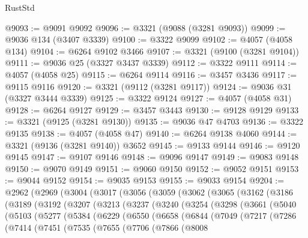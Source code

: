 \begin{lexlean}{RustStd}
\begin{coremodule}
@9093 := @9091 @9092
@9096 := @3321 (@9088 (@3281 @9093))
@9099 := @9036 @134 (@3407 @3339)
@9100 := @3322 @9099
@9102 := @4057 (@4058 @134)
@9104 := @6264 @9102 @3466
@9107 := @3321 (@9100 (@3281 @9104))
@9111 := @9036 @25 (@3327 @3437 @3339)
@9112 := @3322 @9111
@9114 := @4057 (@4058 @25)
@9115 := @6264 @9114
@9116 := @3457 @3436
@9117 := @9115 @9116
@9120 := @3321 (@9112 (@3281 @9117))
@9124 := @9036 @31 (@3327 @3444 @3339)
@9125 := @3322 @9124
@9127 := @4057 (@4058 @31)
@9128 := @6264 @9127
@9129 := @3457 @3443
@9130 := @9128 @9129
@9133 := @3321 (@9125 (@3281 @9130))
@9135 := @9036 @47 @4703
@9136 := @3322 @9135
@9138 := @4057 (@4058 @47)
@9140 := @6264 @9138 @4060
@9144 := @3321 (@9136 (@3281 @9140)) @3652
@9145 := @9133 @9144
@9146 := @9120 @9145
@9147 := @9107 @9146
@9148 := @9096 @9147
@9149 := @9083 @9148
@9150 := @9070 @9149
@9151 := @9060 @9150
@9152 := @9052 @9151
@9153 := @9044 @9152
@9154 := @9035 @9153
@9155 := @9033 @9154
@9204 := @2962
    (@2969
      (@3004
        (@3017
          (@3056
            (@3059
              (@3062
                (@3065
                  (@3162
                    (@3186
                      (@3189
                        (@3192
                          (@3207
                            (@3213
                              (@3237
                                (@3240
                                  (@3254
                                    (@3298
                                      (@3661
                                        (@5040
                                          (@5103
                                            (@5277
                                              (@5384
                                                (@6229
                                                  (@6550
                                                    (@6658
                                                      (@6844
                                                        (@7049
                                                          (@7217
                                                            (@7286
                                                              (@7414
                                                                (@7451
                                                                  (@7535
                                                                    (@7655
                                                                      (@7706
                                                                        (@7866
                                                                          (@8008

\end{coremodule}
\end{lexlean}

